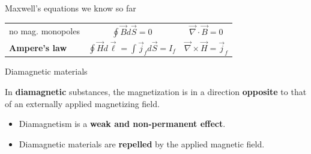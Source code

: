 \begin{frame}{Maxwell's equations we know so far}
{\begin{center}
{\begin{table}[H]
\begin{tabular}{|l|c|c|}
      no mag. monopoles &
        $\displaystyle \oint \vec{B} d\vec{S} = 0$ &
        $\displaystyle \vec{\nabla} \cdot \vec{B} = 0$ \\

      {\bf Ampere's law} &
        $\displaystyle \oint \vec{H} d\vec{\ell} =  \int \vec{j}_{f} d\vec{S} = I_{f}$ &
        $\displaystyle \vec{\nabla} \times \vec{H} = \vec{j}_{f}$ \\
      \hline
    \end{tabular}
  \end{table}
}
\end{center}

}

\end{frame}

%
%
%

\begin{frame}{Diamagnetic materials}

In {\bf diamagnetic} substances, the magnetization is in a direction
{\bf opposite} to that of an externally applied magnetizing field.
\begin{itemize}
  \item Diamagnetism is a {\bf weak and non-permanent effect}.
  \item Diamagnetic materials are {\bf repelled} by the applied magnetic field.
\end{itemize}
\vspace{0.3cm}


\end{frame}
